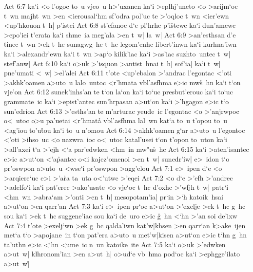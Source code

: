\vs Act 6:7
ka`i
<o
l'ogoc
to~u
vjeo~u
h>'uxanen
ka`i
>eplhj'uneto
<o
>arijm`oc
t~wn
majht~wn
>en
<ierousal`hm
sf'odra
pol'uc
te
>'oqloc
t~wn
<ier'ewn
<up'hkouon
t~h|
p'istei\bibvsend
\vs Act 6:8
st'efanoc
d`e
pl'hrhc
p'i\r{s}tewc
ka`i
dun'amewc
>epo'iei
t'erata
ka`i
shme~ia
meg'ala
>en
t~w|
la~w|\bibvsend
\vs Act 6:9
>an'esthsan
d'e
tinec
t~wn
>ek
t~hc
sunagwg~hc
t~hc
legom'enhc
libert'inwn
ka`i
kurhna'iwn
ka`i
>alexandr'ewn
ka`i
t~wn
>ap`o
kilik'iac
ka`i
>as'iac
suzhto~untec
t~w|
stef'anw|\bibvsend
\vs Act 6:10
ka`i
o>uk
>'isquon
>antist~hnai
t~h|
sof'ia|
ka`i
t~w|
pne'umati
<~w|
>el'alei\bibvsend
\vs Act 6:11
t'ote
<up'ebalon
>'andrac
l'egontac
<'oti
>akhk'oamen
a>uto~u
lalo~untoc
<r'hmata
vbl'asfhma
e>ic
mw\r{s}~hn
ka`i
t`on
vje'on\bibvsend
\vs Act 6:12
sunek'inhs'an
te
t`on
la`on
ka`i
to`uc
presbut'erouc
ka`i
to`uc
grammate~ic
ka`i
>epist'antec
sun'hrpasan
a>ut`on
ka`i
>'hgagon
e>ic
t`o
sun'edrion\bibvsend
\vs Act 6:13
>'esths'an
te
m'arturac
yeude~ic
l'egontac
<o
>'anjrwpoc
o<~utoc
o>u
pa'uetai
<r'hmata\r{}
vbl'asfhma
lal~wn
kat`a
to~u
t'opou
to~u
<ag'iou
to'u\r{t}ou
ka`i
to~u
n'omou\bibvsend
\vs Act 6:14
>akhk'oamen
g`ar
a>uto~u
l'egontoc
<'oti
>ihso~uc
<o
nazwra~ioc
o<~utoc
katal'usei
t`on
t'opon
to~uton
ka`i
>all'axei
t`a
>'ejh
<`a
par'edwken
<hm~in
mw"u\r{s}~hc\bibvsend
{}
\vs Act 6:15
ka`i
>aten'isantec
e>ic
a>ut`on
<'a\r{p}antec
o<i
kajez'omenoi
>en
t~w|
sunedr'iw|
e>~idon
t`o
pr'oswpon
a>uto~u
<wse`i
pr'oswpon
>agg'elou\bibvsend
\vs Act 7:1
e>~ipen
d`e
<o
>arqiere`uc
e>i
>'a\r{r}a
ta~uta
o<'utwc
>'eqei\bibvsend
\vs Act 7:2
<o
d`e
>'efh
>'andrec
>adelfo`i
ka`i
pat'erec
>ako'usate
<o
vje`oc
t~hc
d'oxhc
>'wfjh
t~w|
patr`i
<hm~wn
>abra`am
>'onti
>en
t~h|
mesopotam'ia|
pr`in
>`h
katoik~hsai
a>ut`on
>en
qarr'an\bibvsend
\vs Act 7:3
ka`i
e>~ipen
pr`oc
a>ut`on
>'exelje
>ek
t~hc
g~hc
sou
ka`i
>ek
t~hc
suggene'iac
sou
ka`i
de~uro
e>ic
\r{g}~hn
<`hn
>'an
soi
de'ixw\bibvsend
\vs Act 7:4
t'ote
>exelj`wn
>ek
g~hc
qalda'iwn
kat'w|khsen
>en
qarr`an
k>ake~ijen
met`a
t`o
>apojane~in
t`on
pat'era
a>uto~u
met'w|kisen
a>ut`on
e>ic
t`hn
g~hn
ta'uthn
e>ic
<`hn
<ume~ic
n~un
katoike~ite\bibvsend
\vs Act 7:5
ka`i
o>uk
>'edwken
a>ut~w|
klhronom'ian
>en
a>ut~h|
o>ud`e
vb~hma
pod`oc
ka`i
>ephgge'ilato
a>ut~w|\r{}
